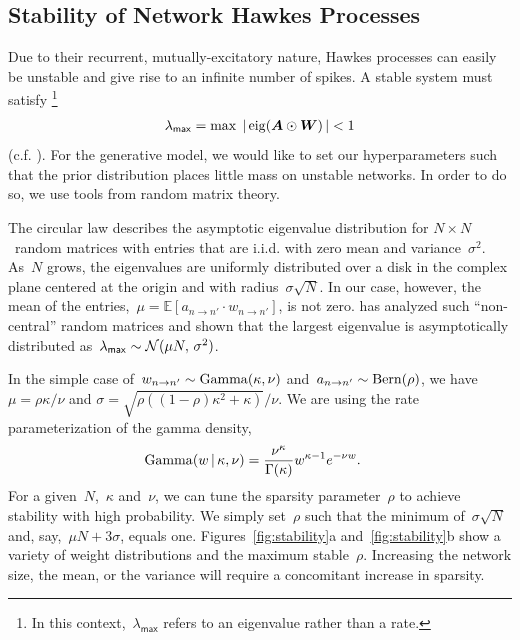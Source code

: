 \subsection{Stability of Network Hawkes Processes}
\label{sec:stability}


Due to their recurrent, mutually-excitatory nature, Hawkes processes
can easily be unstable and give rise to an infinite 
number of spikes. A stable system must satisfy \footnote{In
  this context,~${\lambda_{\mathsf{max}}}$ refers to an eigenvalue
  rather than a rate.}
\begin{align*}
  \lambda_{\mathsf{max}}=\max\; |\,\mathrm{eig}(\boldsymbol{A}\odot\boldsymbol{W})\,| < 1
\end{align*}
(c.f. \citet{daley2003introduction1}).
For the generative model, we would like
to set our hyperparameters such that the prior distribution places
little mass on unstable networks. In order to do so, we use tools from
random matrix theory.

The circular law describes the asymptotic eigenvalue distribution for
$N \times N$~random matrices with entries that are i.i.d. with zero
mean and variance~$\sigma^2$. As~$N$ grows, the eigenvalues are
uniformly distributed over a disk in the complex plane centered at the
origin and with radius~$\sigma\sqrt{N}$. In our case, however, the
mean of the entries,~${\mu=\mathbb{E}[a_{n \to n'} \cdot w_{n \to
      n'}]}$, is not zero. \citet{Silverstein-1994} has analyzed such
``non-central'' random matrices and shown that the largest eigenvalue
is asymptotically distributed
as~${\lambda_{\sf{max}} \sim \mathcal{N}(\mu N,\, \sigma^2)}$.

In the simple case of~${w_{n \to n'}\sim \mathrm{Gamma}(\kappa,\nu)}$
and~${a_{n \to n'}\sim\mathrm{Bern}(\rho)}$, we have
${\mu = \rho \kappa/\nu}$ and
${\sigma=\sqrt{\rho((1-\rho)\kappa^2+\kappa)}/\nu}$. We are using the 
rate parameterization of the gamma density, 
\begin{align*}
\mathrm{Gamma}(w \,|\, \kappa, \nu) &= \frac{\nu^{\kappa}}{\Gamma(\kappa)}w^{\kappa- 1} e^{-\nu w}.
\end{align*}
For a
given~$N$,~$\kappa$ and~$\nu$, we can tune the sparsity
parameter~$\rho$ to achieve stability with high probability. We simply
set~$\rho$ such that the minimum of~$\sigma\sqrt{N}$ and,
say,~${\mu N + 3\sigma}$, equals one. Figures~\ref{fig:stability}a
and~\ref{fig:stability}b show a variety of weight distributions
and the maximum stable~$\rho$. Increasing the network size, the mean,
or the variance will require a concomitant increase in sparsity.

